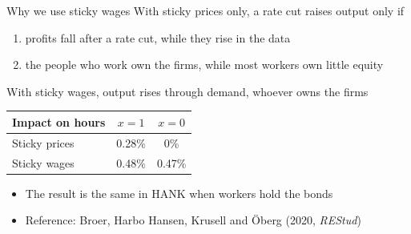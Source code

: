 \documentclass[10pt,english]{beamer}
\begin{document}
%
\begin{frame}{Why we use sticky wages}
With sticky prices only, a rate cut raises output only if
\begin{enumerate}
\item profits fall after a rate cut, while they rise in the data
\item the people who work own the firms, while most workers own little equity
\end{enumerate}
\medskip{}
With sticky wages, output rises through demand, whoever owns the firms
\medskip{}
\begin{center}
\begin{tabular}{lcc}
\hline 
Impact on hours & $x=1$ & $x=0$\tabularnewline
\hline 
Sticky prices & 0.28\% & 0\%\tabularnewline
Sticky wages & 0.48\% & 0.47\%\tabularnewline
\hline 
\end{tabular}
\end{center}
\medskip{}
\begin{itemize}
\item The result is the same in HANK when workers hold the bonds
\item Reference: Broer, Harbo Hansen, Krusell and Öberg (2020, \emph{REStud})
\end{itemize}
\end{frame}
\end{document}
